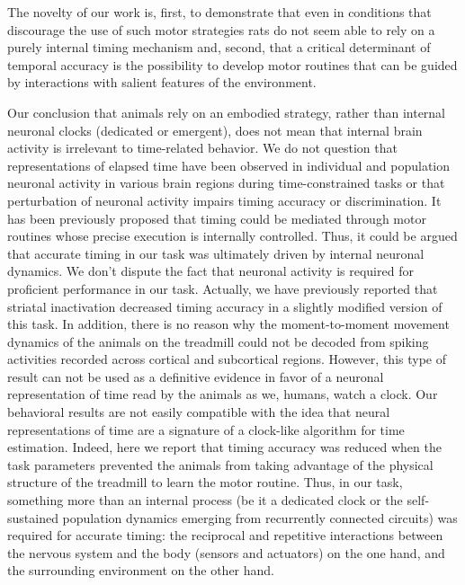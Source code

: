 The novelty of our work is, first, to demonstrate that even in conditions that discourage the use of such motor strategies rats do not seem able to rely on a purely internal timing mechanism and, second, that a critical determinant of temporal accuracy is the possibility to develop motor routines that can be guided by interactions with salient features of the environment.
\par
Our conclusion that animals rely on an embodied strategy, rather than internal neuronal clocks (dedicated or emergent), does not mean that internal brain activity is irrelevant to time-related behavior.
We do not question that representations of elapsed time have been observed in individual and population neuronal activity in various brain regions during time-constrained tasks or that perturbation of neuronal activity impairs timing accuracy or discrimination.
It has been previously proposed that timing could be mediated through motor routines whose precise execution is internally controlled\cite{Killeen1988,Dragoi2003, Staddon1999,Machado1997}.
Thus, it could be argued that accurate timing in our task was ultimately driven by internal neuronal dynamics.
We don't dispute the fact that neuronal activity is required for proficient performance in our task.
Actually, we have previously reported that striatal inactivation decreased timing accuracy in a slightly modified version of this task\cite{Rueda2015NatNeuro}.
In addition, there is no reason why the moment-to-moment movement dynamics of the animals on the treadmill could not be decoded from spiking activities recorded across cortical and subcortical regions.
However, this type of result can not be used as a definitive evidence in favor of a neuronal representation of time read by the animals as we, humans, watch a clock\cite{Krakauer2017Neuron, Buzsaki2017Science, Buzsaki2018TICS}.
Our behavioral results are not easily compatible with the idea that neural representations of time are a signature of a clock-like algorithm for time estimation.
Indeed, here we report that timing accuracy was reduced when the task parameters prevented the animals from taking advantage of the physical structure of the treadmill to learn the motor routine.
Thus, in our task, something more than an internal process (be it a dedicated clock or the self-sustained population dynamics emerging from recurrently connected circuits)  was required for accurate timing:
the reciprocal and repetitive interactions between the nervous system and the body (sensors and actuators) on the one hand, and the surrounding environment on the other hand.
